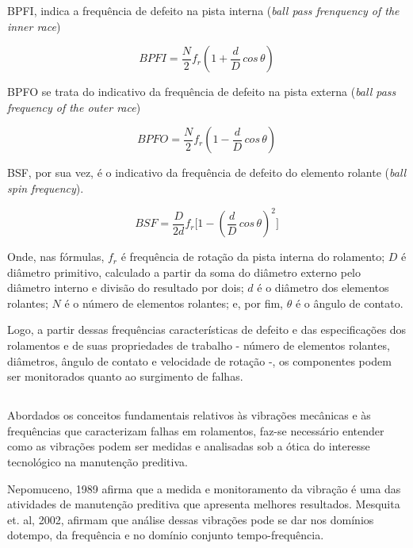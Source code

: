\documentclass[
	12pt,				
	oneside,			
	a4paper,			
	english,			
	brazil,	
	sumario=abnt-6027-2012		
	]{abntex2ppgsi}
\begin{document}
BPFI, indica a frequência de defeito na pista interna (\textit{ball pass frenquency of the inner race})

\begin{equation}
	BPFI = \frac{N}{2}f_{r} \left ( 1 + \frac{d}{D} \,cos \, \theta \right ) 
	\label{eq: BPFI}
\end{equation}

BPFO se trata do indicativo da frequência de defeito na pista externa (\textit{ball pass frequency of the outer race})

\begin{equation}
	BPFO = \frac{N}{2}f_{r} \left ( 1 - \frac{d}{D} \,cos \, \theta \right )
	\label{eq: BPFO}
\end{equation}

BSF, por sua vez, é o indicativo da frequência de defeito do elemento rolante (\textit{ball spin frequency}).

\begin{equation}
	BSF = \frac{D}{2d}f_{r} \Bigg[  1 - \left ( \frac{d}{D} \,cos \, \theta \right ) ^{2}  \Bigg]
	\label{eq: BSF}
\end{equation}

Onde, nas fórmulas, $f_{r}$ é frequência de rotação da pista interna do rolamento; $D$ é diâmetro primitivo, calculado a partir da soma do diâmetro externo pelo diâmetro interno e divisão do resultado por dois; $d$ é o diâmetro dos elementos rolantes; $N$ é o número de elementos rolantes; e, por fim, $\theta$ é o ângulo de contato.

Logo, a partir dessas frequências características de defeito e das especificações dos rolamentos e de suas propriedades de trabalho - número de elementos rolantes, diâmetros, ângulo de contato e velocidade de rotação -, os componentes podem ser monitorados quanto ao surgimento de falhas.  

\subsection{}

Abordados os conceitos  fundamentais relativos às vibrações mecânicas e às frequências que caracterizam falhas em rolamentos, faz-se necessário entender como as vibrações podem ser medidas e analisadas sob a ótica do interesse tecnológico na manutenção preditiva. 

Nepomuceno, 1989 afirma que a medida e monitoramento da vibração é uma das atividades de manutenção preditiva que apresenta melhores resultados. Mesquita et. al, 2002, afirmam que análise dessas vibrações pode se dar nos domínios dotempo, da frequência e no domínio conjunto tempo-frequência.
\end{document}
